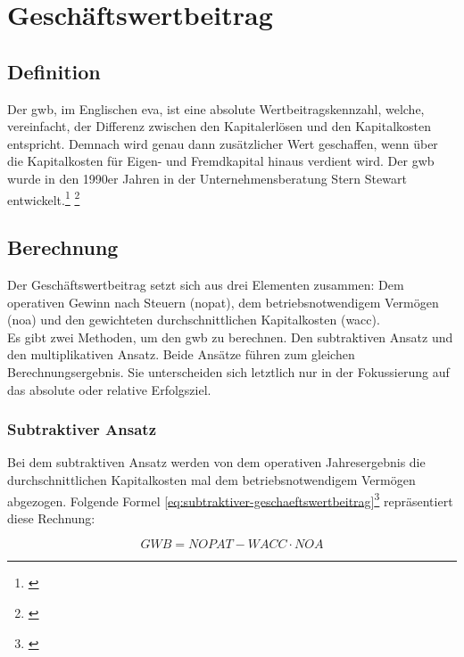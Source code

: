 \chapter{Geschäftswertbeitrag}
\label{Geschaeftswertbeitrag}

\section{Definition}

Der \ac{gwb}, im Englischen \ac{eva}, ist eine absolute Wertbeitragskennzahl, welche, vereinfacht, der Differenz zwischen den Kapitalerlösen und den Kapitalkosten entspricht. Demnach wird genau dann zusätzlicher Wert geschaffen, wenn über die Kapitalkosten für Eigen- und Fremdkapital hinaus verdient wird. Der \ac{gwb} wurde in den 1990er Jahren in der Unternehmensberatung Stern Stewart entwickelt.\footnote{\cite{wikipedia-eva}} \footnote{\cite{controlling-eva}}

\section{Berechnung}

Der Geschäftswertbeitrag setzt sich aus drei Elementen zusammen: Dem operativen Gewinn nach Steuern (\ac{nopat}), dem betriebsnotwendigem Vermögen (\ac{noa}) und den gewichteten durchschnittlichen Kapitalkosten (\ac{wacc}).\\

\noindent
Es gibt zwei Methoden, um den \ac{gwb} zu berechnen. Den subtraktiven Ansatz und den multiplikativen Ansatz. Beide Ansätze führen zum gleichen Berechnungsergebnis. Sie unterscheiden sich letztlich nur in der Fokussierung auf das absolute oder relative Erfolgsziel.

\subsection{Subtraktiver Ansatz}

Bei dem subtraktiven Ansatz werden von dem operativen Jahresergebnis die durchschnittlichen Kapitalkosten mal dem betriebsnotwendigem Vermögen abgezogen. Folgende Formel \eqref{eq:subtraktiver-geschaeftswertbeitrag}\footnote{\cite{wikipedia-eva}} repräsentiert diese Rechnung:

\begin{equation}
    GWB = NOPAT - WACC \cdot NOA
    \label{eq:subtraktiver-geschaeftswertbeitrag}
\end{equation}

